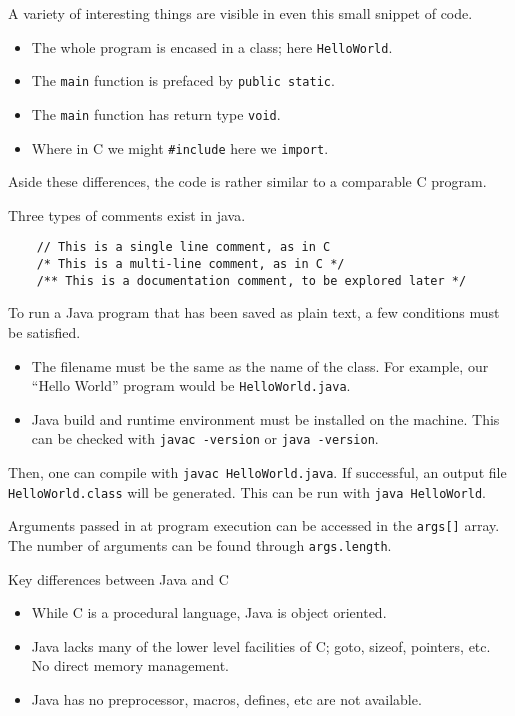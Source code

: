 \documentclass[12pt]{report}
\newcommand{\code}[1]{\lstinline{#1}}
\begin{document}
\begin{flushleft}
A variety of interesting things are visible in even this small snippet of
code.
\begin{itemize}
    \item The whole program is encased in a class; here \code{HelloWorld}.
    \item The \code{main} function is prefaced by \code{public static}.
    \item The \code{main} function has return type \code{void}.
    \item Where in C we might \code{#include} here we \code{import}. 
\end{itemize}
Aside these differences, the code is rather similar to a comparable C program.

\bigskip
Three types of comments exist in java.
\begin{lstlisting}
    // This is a single line comment, as in C
    /* This is a multi-line comment, as in C */
    /** This is a documentation comment, to be explored later */
\end{lstlisting}

\bigskip
To run a Java program that has been saved as plain text, a few conditions must
be satisfied.
\begin{itemize}
    \item The filename must be the same as the name of the class. For example,
        our ``Hello World'' program would be \code{HelloWorld.java}.
    \item Java build and runtime environment must be installed on the machine.
        This can be checked with \code{javac -version} or \code{java -version}.
\end{itemize}
Then, one can compile with \code{javac HelloWorld.java}. If successful, an 
output file \code{HelloWorld.class} will be generated. This can be run with
\code{java HelloWorld}.

\bigskip
Arguments passed in at program execution can be accessed in the \code{args[]} 
array. The number of arguments can be found through \code{args.length}.

\bigskip
Key differences between Java and C
\begin{itemize}
    \item While C is a procedural language, Java is object oriented.
    \item Java lacks many of the lower level facilities of C; goto, sizeof,
        pointers, etc. No direct memory management.
    \item Java has no preprocessor, macros, defines, etc are not available.
\end{itemize}


\end{flushleft}
\end{document}
